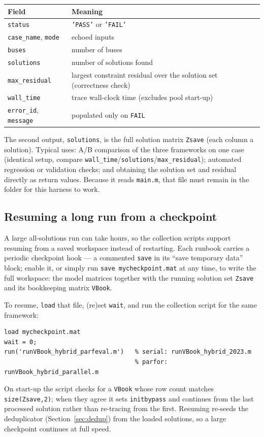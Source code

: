 \documentclass[11pt,a4paper]{article}
\newcommand{\code}[1]{\texttt{#1}}
\begin{document}
\begin{center}\small
\begin{tabular}{@{}ll@{}}
\toprule
Field & Meaning\\
\midrule
\code{status} & \code{'PASS'} or \code{'FAIL'}\\
\code{case_name}, \code{mode} & echoed inputs\\
\code{buses} & number of buses\\
\code{solutions} & number of solutions found\\
\code{max_residual} & largest constraint residual over the solution set (correctness check)\\
\code{wall_time} & trace wall-clock time (excludes pool start-up)\\
\code{error_id}, \code{message} & populated only on \code{FAIL}\\
\bottomrule
\end{tabular}
\end{center}
The second output, \code{solutions}, is the full solution matrix \code{Zsave} (each column
a solution). Typical uses: A/B comparison of the three frameworks on one case (identical
setup, compare \code{wall_time}/\code{solutions}/\code{max_residual}); automated
regression or validation checks; and obtaining the solution set and residual directly as
return values. Because it reads \code{main.m}, that file must remain in the folder for
this harness to work.

\subsection{Resuming a long run from a checkpoint}\label{sec:resume}
A large all-solutions run can take hours, so the collection scripts support resuming from a
saved workspace instead of restarting. Each runbook carries a periodic checkpoint hook --- a
commented \code{save} in its ``save temporary data'' block; enable it, or simply run
\code{save mycheckpoint.mat} at any time, to write the full workspace: the model matrices
together with the running solution set \code{Zsave} and its bookkeeping matrix \code{VBook}.

To resume, \code{load} that file, (re)set \code{wait}, and run the collection script for the
same framework:
\begin{lstlisting}[style=mat]
load mycheckpoint.mat
wait = 0;
run('runVBook_hybrid_parfeval.m')   % serial: runVBook_hybrid_2023.m
                                    % parfor: runVBook_hybrid_parallel.m
\end{lstlisting}
On start-up the script checks for a \code{VBook} whose row count matches
\code{size(Zsave,2)}; when they agree it sets \code{initbypass} and continues from the last
processed solution rather than re-tracing from the first. Resuming re-seeds the deduplicator
(Section~\ref{sec:dedup}) from the loaded solutions, so a large checkpoint continues at full
speed.
\end{document}
